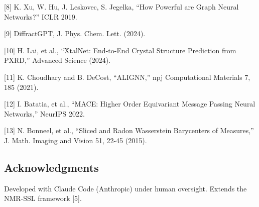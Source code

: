 \documentclass[
  11pt,
]{article}
\begin{document}
{[}8{]} K. Xu, W. Hu, J. Leskovec, S. Jegelka, ``How Powerful are Graph
Neural Networks?'' ICLR 2019.

{[}9{]} DiffractGPT, J. Phys. Chem. Lett. (2024).

{[}10{]} H. Lai, et al., ``XtalNet: End-to-End Crystal Structure
Prediction from PXRD,'' Advanced Science (2024).

{[}11{]} K. Choudhary and B. DeCost, ``ALIGNN,'' npj Computational
Materials 7, 185 (2021).

{[}12{]} I. Batatia, et al., ``MACE: Higher Order Equivariant Message
Passing Neural Networks,'' NeurIPS 2022.

{[}13{]} N. Bonneel, et al., ``Sliced and Radon Wasserstein Barycenters
of Measures,'' J. Math. Imaging and Vision 51, 22-45 (2015).

\subsection{Acknowledgments}\label{acknowledgments}

Developed with Claude Code (Anthropic) under human oversight. Extends
the NMR-SSL framework {[}5{]}.
\end{document}
